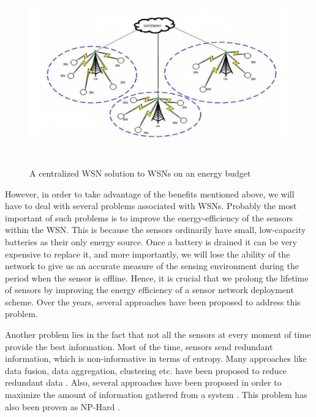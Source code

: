 \begin{figure}
\begin{center}
\includegraphics[height = 80mm, width = 150mm, scale = 2]{figs/CWSN}
\caption{A centralized WSN solution to WSNs on an energy budget}
\label{cwsn}
\end{center}
\end{figure}

However, in order to take advantage of the benefits mentioned above,
we will have to deal with several problems associated with
WSNs. Probably the most important of such problems is to improve the
energy-efficiency of the sensors within the WSN. This is because the
sensors ordinarily have small, low-capacity batteries as their only
energy source. Once a battery is drained it can be very expensive to
replace it, and more importantly, we will lose the ability of the
network to give us an accurate measure of the sensing environment
during the period when the sensor is offline. Hence, it is crucial
that we prolong the lifetime of sensors by improving the energy
efficiency of a sensor network deployment scheme. Over the years,
several approaches have been proposed to address this problem.

Another problem lies in the fact that not all the sensors at every
moment of time provide the best information. Most of the time, sensors
send redundant information, which is non-informative in terms of
entropy. Many approaches like data fusion, data aggregation,
clustering etc. have been proposed to reduce redundant data
\cite{abbasi2007survey} \cite{rajagopalan2006data}. Also, several
approaches have been proposed in order to maximize the amount of
information gathered from a system \cite{ji2014data}. This problem has
also been proven as NP-Hard \cite{chou2009energy}.


